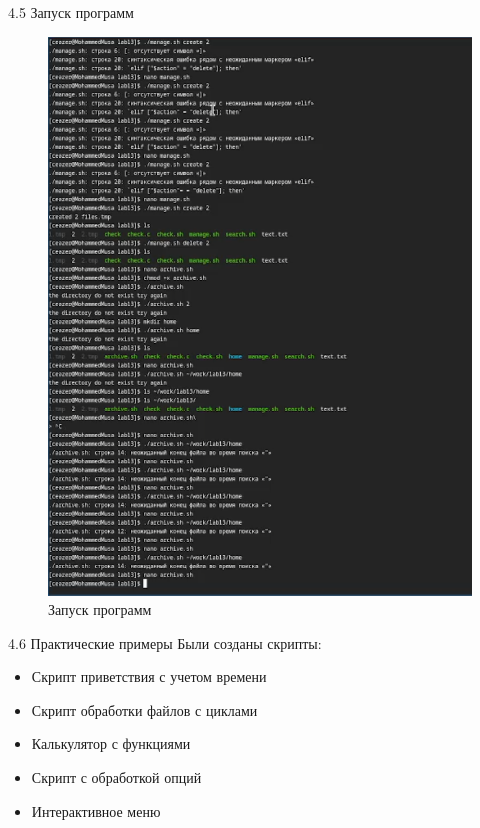 \documentclass[
  ignorenonframetext,
  aspectratio=169,
  russian,
]{beamer}
\providecommand{\tightlist}{%
  \setlength{\itemsep}{0pt}\setlength{\parskip}{0pt}}
\begin{document}
\begin{frame}{4.5 Запуск программ}
\label{ux437ux430ux43fux443ux441ux43a-ux43fux440ux43eux433ux440ux430ux43cux43c}
\begin{figure}[H]

{\centering \includegraphics[width=0.7\linewidth,height=\textheight,keepaspectratio]{image/run2.png}

}

\caption{Запуск программ}

\end{figure}%
\end{frame}

\begin{frame}{4.6 Практические примеры}
\label{ux43fux440ux430ux43aux442ux438ux447ux435ux441ux43aux438ux435-ux43fux440ux438ux43cux435ux440ux44b}
Были созданы скрипты:

\begin{itemize}[<+->]
\tightlist
\item
  Скрипт приветствия с учетом времени
\item
  Скрипт обработки файлов с циклами
\item
  Калькулятор с функциями
\item
  Скрипт с обработкой опций
\item
  Интерактивное меню
\end{itemize}
\end{frame}
\end{document}
